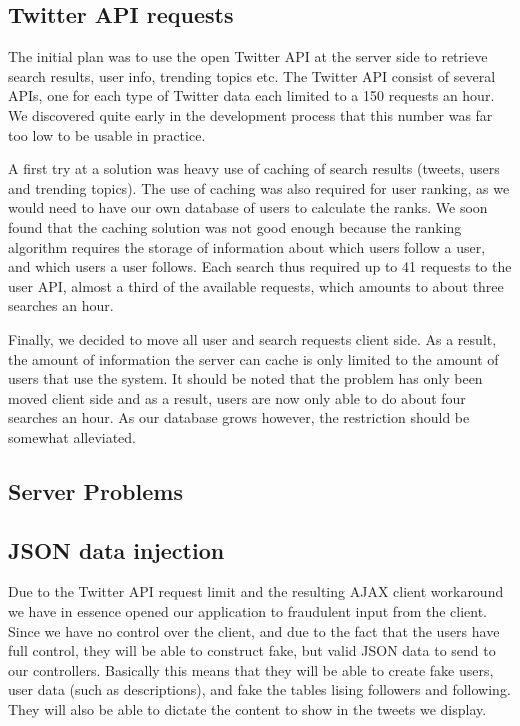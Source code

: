 \subsection{Twitter API requests}
The initial plan was to use the open Twitter API at the server side to retrieve search results, user info, trending topics etc. The Twitter API consist of several APIs, one for each type of Twitter data each limited to a 150 requests an hour. We discovered quite early in the development process that this number was far too low to be usable in practice. 

A first try at a solution was heavy use of caching of search results (tweets, users and trending topics). The use of caching was also required for user ranking, as we would need to have our own database of users to calculate the ranks. We soon found that the caching solution was not good enough because the ranking algorithm requires the storage of information about which users follow a user, and which users a user follows. Each search thus required up to 41 requests to the user API, almost a third of the available requests, which amounts to about three searches an hour.

Finally, we decided to move all user and search requests client side. As a result, the amount of information the server can cache is only limited to the amount of users that use the system. It should be noted that the problem has only been moved client side and as a result, users are now only able to do about four searches an hour. As our database grows however, the restriction should be somewhat alleviated.

\subsection{Server Problems}

\subsection{JSON data injection}
Due to the Twitter API request limit and the resulting AJAX client workaround we have in essence opened our application to fraudulent input from the client. Since we have no control over the client, and due to the fact that the users have full control, they will be able to construct fake, but valid JSON data to send to our controllers. Basically this means that they will be able to create fake users, user data (such as descriptions), and fake the tables lising followers and following. They will also be able to dictate the content to show in the tweets we display.


